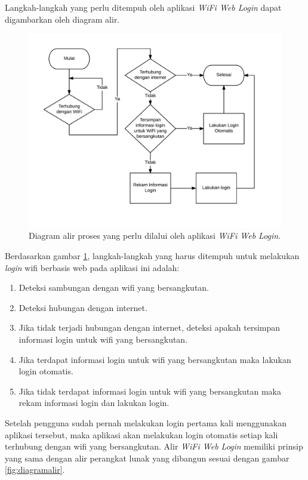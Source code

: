 Langkah-langkah yang perlu ditempuh oleh aplikasi \textit{WiFi Web Login} dapat digambarkan oleh diagram alir.

\begin{figure}[h]
    \centering
    \includegraphics[scale=0.85]{Gambar/WifiWebLogin.png}
    \caption[Diagram alir proses yang perlu dilalui oleh aplikasi \textit{WiFi Web Login}.]{Diagram alir proses yang perlu dilalui oleh aplikasi \textit{WiFi Web Login}.} 
    \label{fig:wifiweblogin}
\end{figure}

Berdasarkan gambar \ref{fig:wifiweblogin}, langkah-langkah yang harus ditempuh untuk melakukan \textit{login} wifi berbasis web pada aplikasi ini adalah:

\begin{enumerate}
    \item{Deteksi sambungan dengan wifi yang bersangkutan.}
    \item{Deteksi hubungan dengan internet.}
    \item{Jika tidak terjadi hubungan dengan internet, deteksi apakah tersimpan informasi login untuk wifi yang bersangkutan.}
    \item{Jika terdapat informasi login untuk wifi yang bersangkutan maka lakukan login otomatis.}
    \item{Jika tidak terdapat informasi login untuk wifi yang bersangkutan maka rekam informasi login dan lakukan login.}
\end{enumerate}

Setelah pengguna sudah pernah melakukan login pertama kali menggunakan aplikasi tersebut, maka aplikasi akan melakukan login otomatis setiap kali terhubung dengan wifi yang bersangkutan. Alir \textit{WiFi Web Login} memiliki prinsip yang sama dengan alir perangkat lunak yang dibangun sesuai dengan gambar \ref{fig:diagramalir}.